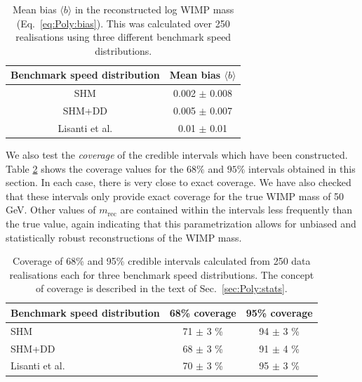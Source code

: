 \begin{table}[t]
  \setlength{\extrarowheight}{3pt}
  \setlength{\tabcolsep}{3pt}
  \begin{center}
	\begin{tabular}{c|c}
        \hline\hline
	Benchmark speed distribution & Mean bias $\langle b \rangle$ \\
	\hline
	SHM & 0.002 $\pm$ 0.008 \\
	SHM+DD & 0.005 $\pm$ 0.007 \\
	Lisanti et al. & 0.01 $\pm$ 0.01 \\
        \hline\hline
	\end{tabular}
  \end{center}
\caption[Mean bias in the reconstructed log WIMP mass using the \PLF method]{Mean bias $\langle b \rangle$ in the reconstructed log WIMP mass (Eq.~\ref{eq:Poly:bias}). This was calculated over 250 realisations using three different benchmark speed distributions.}
\label{tab:Poly:bias}
\end{table}


We also test the \textit{coverage} of the credible intervals which have been constructed.  Table \ref{tab:Poly:coverage} shows the coverage values for the $68\%$ and $95\%$ intervals obtained in this section. In each case, there is very close to exact coverage. We have also checked that these intervals only provide exact coverage for the true WIMP mass of 50 GeV. Other values of $m_\textrm{rec}$ are contained within the intervals less frequently than the true value, again indicating that this parametrization allows for unbiased and statistically robust reconstructions of the WIMP mass.

\begin{table}[t]
  \setlength{\extrarowheight}{3pt}
  \setlength{\tabcolsep}{3pt}
  \begin{center}
	\begin{tabular}{m{1in}|cc}
        \hline\hline
	Benchmark speed distribution & 68\% coverage & 95\% coverage\\
	\hline
	SHM &  71 $\pm$ 3 \% & 94 $\pm$ 3 \%  \\
	SHM+DD & 68 $\pm$ 3 \% & 91 $\pm$ 4 \%  \\
	Lisanti et al. & 70 $\pm$ 3 \% & 95 $\pm$ 3 \%  \\
        \hline \hline
	\end{tabular}
  \end{center}
\caption[Credible interval coverage results for the \PLF method]{Coverage of 68\% and 95\% credible intervals calculated from 250 data realisations each for three benchmark speed distributions. The concept of coverage is described in the text of Sec.~\ref{sec:Poly:stats}.}
\label{tab:Poly:coverage}
\end{table}

